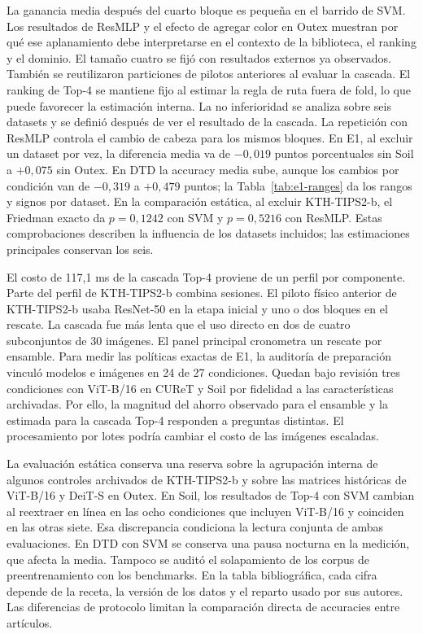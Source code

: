 \documentclass[a4paper,fleqn]{cas-sc}
\begin{document}
La ganancia media después del cuarto bloque es pequeña en el barrido de SVM. Los resultados de ResMLP y el efecto de agregar color en Outex muestran por qué ese aplanamiento debe interpretarse en el contexto de la biblioteca, el ranking y el dominio. El tamaño cuatro se fijó con resultados externos ya observados. También se reutilizaron particiones de pilotos anteriores al evaluar la cascada. El ranking de Top-4 se mantiene fijo al estimar la regla de ruta fuera de fold, lo que puede favorecer la estimación interna. La no inferioridad se analiza sobre seis datasets y se definió después de ver el resultado de la cascada. La repetición con ResMLP controla el cambio de cabeza para los mismos bloques. En E1, al excluir un dataset por vez, la diferencia media va de $-0{,}019$ puntos porcentuales sin Soil a $+0{,}075$ sin Outex. En DTD la accuracy media sube, aunque los cambios por condición van de $-0{,}319$ a $+0{,}479$ puntos; la Tabla~\ref{tab:e1-ranges} da los rangos y signos por dataset. En la comparación estática, al excluir KTH-TIPS2-b, el Friedman exacto da $p=0{,}1242$ con SVM y $p=0{,}5216$ con ResMLP. Estas comprobaciones describen la influencia de los datasets incluidos; las estimaciones principales conservan los seis.

El costo de 117,1 ms de la cascada Top-4 proviene de un perfil por componente. Parte del perfil de KTH-TIPS2-b combina sesiones. El piloto físico anterior de KTH-TIPS2-b usaba ResNet-50 en la etapa inicial y uno o dos bloques en el rescate. La cascada fue más lenta que el uso directo en dos de cuatro subconjuntos de 30 imágenes. El panel principal cronometra un rescate por ensamble. Para medir las políticas exactas de E1, la auditoría de preparación vinculó modelos e imágenes en 24 de 27 condiciones. Quedan bajo revisión tres condiciones con ViT-B/16 en CUReT y Soil por fidelidad a las características archivadas. Por ello, la magnitud del ahorro observado para el ensamble y la estimada para la cascada Top-4 responden a preguntas distintas. El procesamiento por lotes podría cambiar el costo de las imágenes escaladas.

La evaluación estática conserva una reserva sobre la agrupación interna de algunos controles archivados de KTH-TIPS2-b y sobre las matrices históricas de ViT-B/16 y DeiT-S en Outex. En Soil, los resultados de Top-4 con SVM cambian al reextraer en línea en las ocho condiciones que incluyen ViT-B/16 y coinciden en las otras siete. Esa discrepancia condiciona la lectura conjunta de ambas evaluaciones. En DTD con SVM se conserva una pausa nocturna en la medición, que afecta la media. Tampoco se auditó el solapamiento de los corpus de preentrenamiento con los benchmarks. En la tabla bibliográfica, cada cifra depende de la receta, la versión de los datos y el reparto usado por sus autores. Las diferencias de protocolo limitan la comparación directa de accuracies entre artículos.
\end{document}
